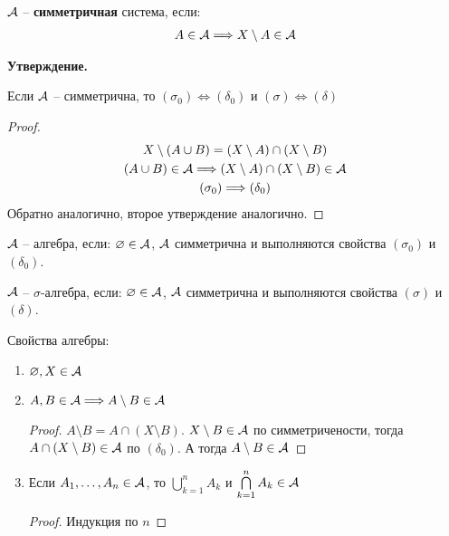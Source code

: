 \begin{conj}
  $\mathcal{A}$ -- \textbf{симметричная} система, если:
  \begin{gather*}
    A \in \mathcal{A} \Longrightarrow X \setminus A \in \mathcal{A} 
  \end{gather*}
\end{conj}

\textbf{Утверждение.} 

Если $\mathcal{A}$ -- симметрична, то $(\sigma_0) \Longleftrightarrow (\delta_0)$ и $(\sigma) \Longleftrightarrow (\delta)$

\begin{proof}
  \begin{gather*}
    X \setminus (A \cup B) = (X \setminus A) \cap (X \setminus B) \\
    (A \cup B) \in \mathcal{A} \Longrightarrow (X \setminus A) \cap (X \setminus B) \in \mathcal{A} \\
    (\sigma_0) \Longrightarrow (\delta_0)
  \end{gather*}
  Обратно аналогично, второе утверждение аналогично.
\end{proof}

\begin{conj}
  $\mathcal{A}$ -- алгебра, если: $\varnothing \in \mathcal{A}$, $\mathcal{A}$ симметрична и выполняются свойства $(\sigma_0)$ и $(\delta_0)$.
\end{conj}

\begin{conj}
  $\mathcal{A}$ -- $\sigma$-алгебра, если: $\varnothing \in \mathcal{A}$, $\mathcal{A}$ симметрична и выполняются свойства $(\sigma)$ и $(\delta)$.
\end{conj}

Свойства алгебры:
\begin{enumerate}
  \item $\varnothing, X \in \mathcal{A}$
  \item $A, B \in \mathcal{A} \Longrightarrow A \setminus B \in \mathcal{A}$
  \begin{proof}
    $A \setminus B = A \cap (X \setminus B)$. $X \setminus B \in \mathcal{A}$ по симметричености, тогда $A \cap (X \setminus B) \in \mathcal{A}$ по $(\delta_0)$. А тогда $A \setminus B \in \mathcal{A}$
  \end{proof}
  \item Если $A_1, \dots, A_n \in \mathcal{A}$, то $\bigcup\limits_{k=1}^n A_k$ и $\bigcap\limits_{k=1}^n A_k \in \mathcal{A}$
  \begin{proof}
    Индукция по $n$
  \end{proof}
\end{enumerate}


